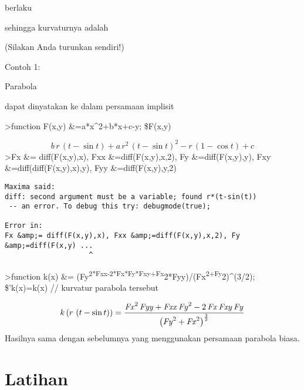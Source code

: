 \documentclass[
]{book}
\begin{document}
berlaku

sehingga kurvaturnya adalah

(Silakan Anda turunkan sendiri!)

Contoh 1:

Parabola

dapat dinyatakan ke dalam persamaan implisit

\textgreater function F(x,y) \&=a*x\^{}2+b*x+c-y; \$F(x,y)

\[b\,r\,\left(t-\sin t\right)+a\,r^2\,\left(t-\sin t\right)^2-r\, \left(1-\cos t\right)+c\]\textgreater Fx \&= diff(F(x,y),x), Fxx \&=diff(F(x,y),x,2), Fy \&=diff(F(x,y),y), Fxy \&=diff(diff(F(x,y),x),y), Fyy \&=diff(F(x,y),y,2)

\begin{verbatim}
Maxima said:
diff: second argument must be a variable; found r*(t-sin(t))
 -- an error. To debug this try: debugmode(true);

Error in:
Fx &amp;= diff(F(x,y),x), Fxx &amp;=diff(F(x,y),x,2), Fy &amp;=diff(F(x,y) ...
                    ^
\end{verbatim}

\textgreater function k(x) \&= (Fy\textsuperscript{2*Fxx-2*Fx*Fy*Fxy+Fx}2*Fyy)/(Fx\textsuperscript{2+Fy}2)\^{}(3/2); \$'k(x)=k(x) // kurvatur parabola tersebut

\[k\left(r\,\left(t-\sin t\right)\right)=\frac{{\it Fx}^2\,{\it Fyy}+ {\it Fxx}\,{\it Fy}^2-2\,{\it Fx}\,{\it Fxy}\,{\it Fy}}{\left({\it Fy}^2+{\it Fx}^2\right)^{\frac{3}{2}}}\]Hasilnya sama dengan sebelumnya yang menggunakan persamaan parabola biasa.

\chapter{Latihan}\label{latihan-3}
\end{document}
